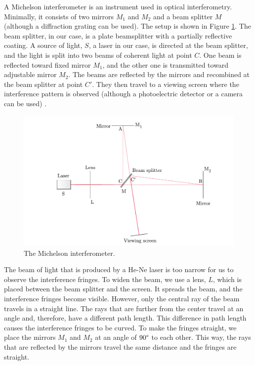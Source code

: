 \documentclass[10pt]{article}
\begin{document}
A Michelson interferometer is an instrument used in optical interferometry. Minimally, it consists of two mirrors $M_1$ and $M_2$ and a beam splitter $M$ (although a diffraction grating can be used). The setup is shown in Figure \ref{fig:1}. The beam splitter, in our case, is a plate beamsplitter with a partially reflective coating. A source of light, $S$, a laser in our case, is directed at the beam splitter, and the light is split into two beams of coherent light at point $C$. One beam is reflected toward fixed mirror $M_1$, and the other one is transmitted toward adjustable mirror $M_2$. The beams are reflected by the mirrors and recombined at the beam splitter at point $C'$. They then travel to a viewing screen where the interference pattern is observed (although a photoelectric detector or a camera can be used) \cite{Hecht_2017}.

\begin{figure}[hbt!]
  \centering
  \includegraphics[scale=0.6]{figures/f1.pdf}
  \caption{The Michelson interferometer.}
  \label{fig:1}
\end{figure}

The beam of light that is produced by a He-Ne laser is too narrow for us to observe the interference fringes. To widen the beam, we use a lens, $L$, which is placed between the beam splitter and the screen. It spreads the beam, and the interference fringes become visible. However, only the central ray of the beam travels in a straight line. The rays that are further from the center travel at an angle and, therefore, have a different path length. This difference in path length causes the interference fringes to be curved. To make the fringes straight, we place the mirrors $M_1$ and $M_2$ at an angle of $90\degree$ to each other. This way, the rays that are reflected by the mirrors travel the same distance and the fringes are straight. 
\end{document}
